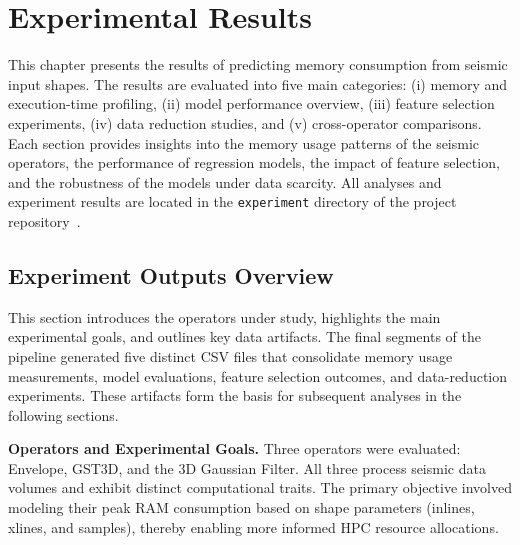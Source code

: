 \section{Experimental Results}
\label{sec:pmc-results}

This chapter presents the results of predicting memory consumption from seismic input shapes.
The results are evaluated into five main categories: (i) memory and execution-time profiling, (ii) model performance overview, (iii) feature selection experiments, (iv) data reduction studies, and (v) cross-operator comparisons.
Each section provides insights into the memory usage patterns of the seismic operators, the performance of regression models, the impact of feature selection, and the robustness of the models under data scarcity.
All analyses and experiment results are located in the \texttt{experiment} directory of the project repository~\cite{delucca2025experiment2results}.

\subsection{Experiment Outputs Overview}
\label{subsec:pmc-results-experiment-outputs-overview}

This section introduces the operators under study, highlights the main experimental goals, and outlines key data artifacts.
The final segments of the pipeline generated five distinct \ac{CSV} files that consolidate memory usage measurements, model evaluations, feature selection outcomes, and data-reduction experiments.
These artifacts form the basis for subsequent analyses in the following sections.

\vspace{1em}
\noindent
\textbf{Operators and Experimental Goals.}
Three operators were evaluated: Envelope, \ac{GST3D}, and the 3D Gaussian Filter.
All three process seismic data volumes and exhibit distinct computational traits.
The primary objective involved modeling their peak \ac{RAM} consumption based on shape parameters (inlines, xlines, and samples), thereby enabling more informed \ac{HPC} resource allocations.

